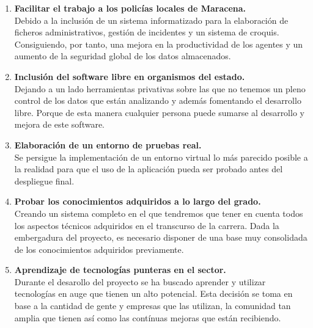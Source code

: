 \begin{enumerate}

    \item \textbf{Facilitar el trabajo a los policías locales de Maracena.}\\
    Debido a la inclusión de un sistema informatizado para la elaboración de 
    ficheros administrativos, gestión de incidentes y un sistema de croquis. Consiguiendo,
    por tanto, una mejora en la productividad de los agentes y un aumento de la seguridad
    global de los datos almacenados.
    
    \item \textbf{Inclusión del software libre en organismos del estado.}\\
    Dejando a un lado herramientas privativas sobre las que no tenemos un pleno control
    de los datos que están analizando y además fomentando el desarrollo libre. Porque 
    de esta manera cualquier persona puede sumarse al desarrollo y mejora de este software.

    \item \textbf{Elaboración de un entorno de pruebas real.}\\
    Se persigue la implementación de un entorno virtual lo más parecido posible a la 
    realidad para que el uso de la aplicación pueda ser probado antes del despliegue 
    final. 
   

   	
    \item \textbf{Probar los conocimientos adquiridos a lo largo del grado.}\\
    Creando un sistema completo en el que tendremos que tener en cuenta todos los 
    aspectos técnicos adquiridos en el transcurso de la carrera. Dada la embergadura del
    proyecto, es necesario disponer de una base muy consolidada de los conocimientos adquiridos
    previamente.
    
    
	
	\cite{gplv3}

    \item \textbf{Aprendizaje de tecnologías punteras en el sector.}\\
    Durante el desarollo del proyecto se ha buscado aprender y utilizar tecnologías en 
    auge que tienen un alto potencial. Esta decisión se toma en base  a la cantidad de gente
    y empresas que las utilizan, la comunidad tan amplia que tienen así como las contínuas
    mejoras que están recibiendo.  

\end{enumerate}
